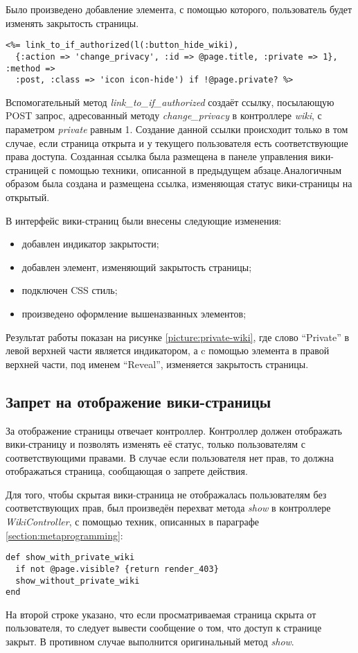 Было произведено добавление элемента, с помощью которого, пользователь будет
изменять закрытость страницы.
\small{\begin{lstlisting}
<%= link_to_if_authorized(l(:button_hide_wiki),
  {:action => 'change_privacy', :id => @page.title, :private => 1}, :method =>
  :post, :class => 'icon icon-hide') if !@page.private? %>
\end{lstlisting}}
Вспомогательный метод \textit{link\_to\_if\_authorized} создаёт ссылку,
посылающую POST запрос, адресованный методу \textit{change\_privacy} в
контроллере \textit{wiki}, с параметром \textit{private} равным 1. Создание
данной ссылки происходит только в том случае, если страница открыта и у
текущего пользователя есть соответствующие права доступа. Созданная ссылка была
размещена в панеле управления вики-страницей с помощью техники, описанной в
предыдущем абзаце.Аналогичным образом была создана и размещена ссылка,
изменяющая статус вики-страницы на открытый.

В интерфейс вики-страниц были внесены следующие изменения:
\begin{itemize}
  \item добавлен индикатор закрытости;
  \item добавлен элемент, изменяющий закрытость страницы;
  \item подключен CSS стиль;
  \item произведено оформление вышеназванных элементов;
\end{itemize}
Результат работы показан на рисунке \ref{picture:private-wiki}, где слово
``Private'' в левой верхней части является индикатором, а c помощью элемента в
правой верхней части, под именем ``Reveal'', изменяется закрытость страницы.


\subsection{Запрет на отображение вики-страницы}
За отображение страницы отвечает контроллер. Контроллер должен отображать
вики-страницу и позволять изменять её статус, только пользователям с
соответствующими правами. В случае если пользователя нет прав, то должна
отображаться страница, сообщающая о запрете действия.

Для того, чтобы скрытая вики-страница не отображалась пользователям без
соответствующих прав, был произведён перехват метода \textit{show} в
контроллере \textit{WikiController}, с помощью техник, описанных в параграфе
\ref{section:metaprogramming}:
\small{\begin{lstlisting}
def show_with_private_wiki
  if not @page.visible? {return render_403}
  show_without_private_wiki
end
\end{lstlisting}}
На второй строке указано, что если просматриваемая страница скрыта от
пользователя, то следует вывести сообщение о том, что доступ к странице закрыт.
В противном случае выполнится оригинальный метод \textit{show}.


